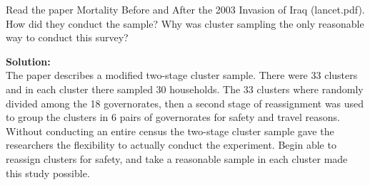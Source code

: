 \documentclass[12pt]{article}
\makeatletter
\theoremstyle{homework}
\newenvironment{exercise}[1]
{\def\@currentlabel{#1}\exercisecore}
{\endexercisecore}
\newcommand{\localhead}[1]{\par\smallskip\noindent\textbf{#1}\nobreak\\}%
\newcommand\solution{\localhead{Solution:}}
\makeatother
\begin{document}
\begin{exercise}{2}Read the paper Mortality Before and After the 2003 Invasion of Iraq (lancet.pdf). 
  How did they conduct the sample? Why was cluster sampling the only reasonable way to conduct this survey?\\
  \solution The paper describes a modified two-stage cluster sample. There were 33 clusters and in each cluster there sampled 30
  households. The 33 clusters where randomly divided among the 18 governorates, then a second stage of reassignment was used to 
  group the clusters in 6 pairs of governorates for safety and travel reasons. Without conducting an entire census the two-stage cluster 
  sample gave the researchers the flexibility to actually conduct the experiment. Begin able to reassign clusters for safety, and take a reasonable sample 
  in each cluster made this study possible. 
\end{exercise}
\vspace{1in}
\end{document}
